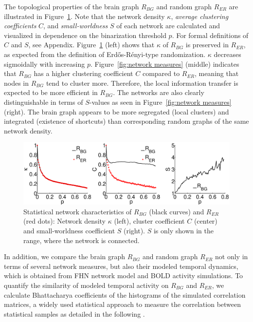 \documentclass[fleqn,10pt]{wlpeerj}
\newcommand{\red}[1]{\textcolor{red}{(#1)}}
\begin{document}
The topological properties of the brain graph $R_{BG}$ and random graph $R_{ER}$ are illustrated  in
Figure~\ref{fig:network measures}. Note that the network density $\kappa$, \textit{average clustering coefficients} $C$,
and \textit{small-worldness} $S$ of each network are calculated and visualized in dependence on the binarization
threshold $p$. For formal definitions of $C$ and $S$, see Appendix. Figure~\ref{fig:network measures}
(left) shows that $\kappa$ of $R_{BG}$ is preserved in $R_{ER}$, as expected from the definition of
Erd\H{o}s-R\'{e}nyi-type randomization. $\kappa$ decreases sigmoidally with increasing $p$. Figure~\ref{fig:network
measures} (middle) indicates that $R_{BG}$ has a higher clustering coefficient $C$ compared to $R_{ER}$, meaning
that nodes in $R_{BG}$ tend to cluster more. Therefore, the local information transfer is expected to be more efficient
in $R_{BG}$. The networks are also clearly distinguishable in terms of $S$-values as seen in Figure~\ref{fig:network
measures} (right). The brain graph appears to be more segregated (local clusters) and integrated (existence of
shortcuts) than corresponding random graphs of the same network density.


\begin{figure}[t!]
\centering
	\includegraphics[width=\textwidth]{Figures/network_meas_05}  
\caption{Statistical network characteristics of $R_{BG}$ (black curves) and $R_{ER}$ (red dots): Network density
$\kappa$ (left), cluster coefficient $C$ (center) and small-worldness coefficient $S$ (right). $S$ is only shown in the
range, where the network is connected.\\
}
\label{fig:network measures}
\end{figure}


In addition, we compare the brain graph $R_{BG}$ and random graph $R_{ER}$ not only in terms of several
network measures, but also their modeled temporal dynamics, which is obtained from FHN network model and BOLD activity
simulations. 
To quantify the similarity of modeled temporal activity on $R_{BG}$ and $R_{ER}$, we calculate
Bhattacharya coefficients of the histograms of the simulated correlation matrices, a widely used
statistical approach to measure the correlation between statistical samples as detailed in the following \citep{XYZ43}.
\end{document}
